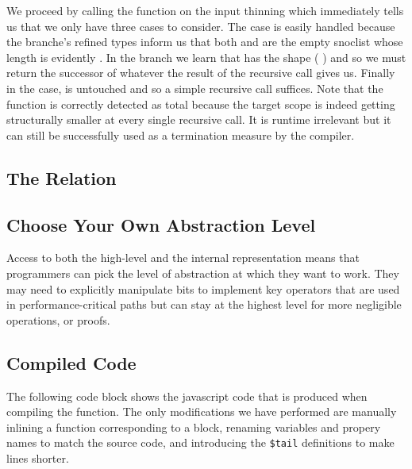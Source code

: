 
We proceed by calling the  function on the input thinning
which immediately tells us that we only have three cases to consider.
%
The  case is easily handled because the branche's refined
types inform us that both  and  are the
empty snoclist \IdrisData{[<]} whose length is evidently .
%
In the  branch we learn that  has the shape
(\IdrisBound{\KatlaUnderscore} \IdrisData{:<} ) and so we must return the
successor of whatever the result of the recursive call gives us.
%
Finally in the  case,  is untouched and so a
simple recursive call suffices.
%
Note that the function is correctly detected as total because the target scope
 is indeed getting structurally smaller at every single recursive
call.
%
It is runtime irrelevant but it can still be successfully used as a termination
measure by the compiler.

\subsection{The  Relation}


\subsection{Choose Your Own Abstraction Level}

Access to both the high-level  and the internal 
representation means that programmers can pick the level of abstraction at which they
want to work.
%
They may need to explicitly manipulate bits to implement key operators that are used
in performance-critical paths but can stay at the highest level for more negligible
operations, or proofs.


\subsection{Compiled Code}

The following code block shows the javascript code that is produced when compiling the
 function.
%
The only modifications we have performed are manually inlining a function
corresponding to a  block, renaming variables and propery names
to match the source code, and introducing the \texttt{\$tail} definitions to make
lines shorter.

